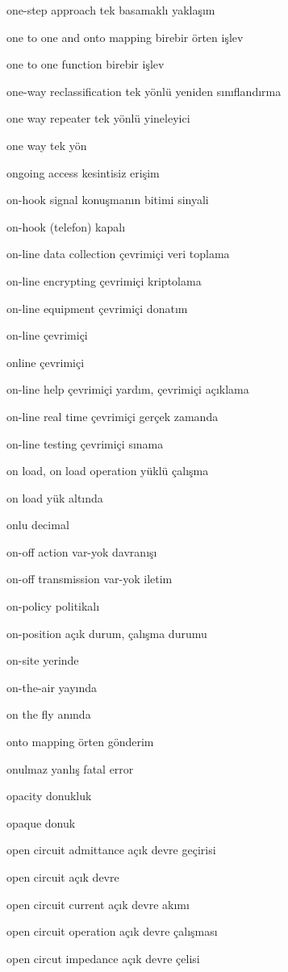 \documentclass[12pt,fleqn]{article}\usepackage{../../common}
\begin{document}
one-step approach tek basamaklı yaklaşım

one to one and onto mapping birebir örten işlev

one to one function birebir işlev

one-way reclassification tek yönlü yeniden sınıflandırma

one way repeater tek yönlü yineleyici

one way tek yön

ongoing access kesintisiz erişim

on-hook signal konuşmanın bitimi sinyali

on-hook (telefon) kapalı

on-line data collection çevrimiçi veri toplama

on-line encrypting çevrimiçi kriptolama

on-line equipment çevrimiçi donatım

on-line çevrimiçi

online çevrimiçi

on-line help çevrimiçi yardım, çevrimiçi açıklama

on-line real time çevrimiçi gerçek zamanda

on-line testing çevrimiçi sınama

on load, on load operation yüklü çalışma

on load yük altında

onlu decimal

on-off action var-yok davranışı

on-off transmission var-yok iletim

on-policy politikalı

on-position açık durum, çalışma durumu

on-site yerinde

on-the-air yayında

on the fly anında

onto mapping örten gönderim

onulmaz yanlış fatal error

opacity donukluk

opaque donuk

open circuit admittance açık devre geçirisi

open circuit açık devre

open circuit current açık devre akımı

open circuit operation açık devre çalışması

open circut impedance açık devre çelisi
\end{document}
